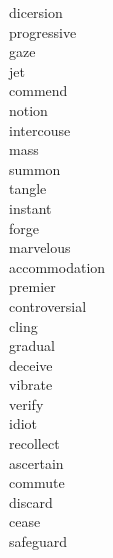 \documentclass[a4paper, 10pt]{ctexart}
\begin{document}
\begin{multicols*}{2}
\begin{description}
\item[dicersion]

\item[progressive]

\item[gaze]

\item[jet]

\item[commend]

\item[notion]

\item[intercouse]

\item[mass]

\item[summon]

\item[tangle]

\item[instant]

\item[forge]

\item[marvelous]

\item[accommodation]

\item[premier]

\item[controversial]

\item[cling]

\item[gradual]

\item[deceive]

\item[vibrate]

\item[verify]

\item[idiot]

\item[recollect]

\item[ascertain]

\item[commute]

\item[discard]

\item[cease]

\item[safeguard]


\end{description}
\end{multicols*}
\end{document}
